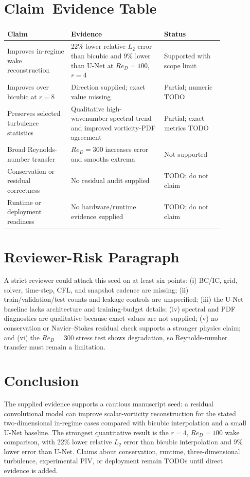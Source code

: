 \documentclass[11pt]{article}
\begin{document}
\section{Claim--Evidence Table}
\begin{center}
\begin{tabular}{p{0.26\linewidth}p{0.38\linewidth}p{0.24\linewidth}}
\toprule
Claim & Evidence & Status \\
\midrule
Improves in-regime wake reconstruction & 22\% lower relative $L_2$ error than bicubic and 9\% lower than U-Net at $Re_D=100$, $r=4$ & Supported with scope limit \\
Improves over bicubic at $r=8$ & Direction supplied; exact value missing & Partial; numeric TODO \\
Preserves selected turbulence statistics & Qualitative high-wavenumber spectral trend and improved vorticity-PDF agreement & Partial; exact metrics TODO \\
Broad Reynolds-number transfer & $Re_D=300$ increases error and smooths extrema & Not supported \\
Conservation or residual correctness & No residual audit supplied & TODO; do not claim \\
Runtime or deployment readiness & No hardware/runtime evidence supplied & TODO; do not claim \\
\bottomrule
\end{tabular}
\end{center}

\section{Reviewer-Risk Paragraph}
A strict reviewer could attack this seed on at least six points: (i) BC/IC, grid, solver, time-step, CFL, and snapshot cadence are missing; (ii) train/validation/test counts and leakage controls are unspecified; (iii) the U-Net baseline lacks architecture and training-budget details; (iv) spectral and PDF diagnostics are qualitative because exact values are not supplied; (v) no conservation or Navier--Stokes residual check supports a stronger physics claim; and (vi) the $Re_D=300$ stress test shows degradation, so Reynolds-number transfer must remain a limitation.

\section{Conclusion}
The supplied evidence supports a cautious manuscript seed: a residual convolutional model can improve scalar-vorticity reconstruction for the stated two-dimensional in-regime cases compared with bicubic interpolation and a small U-Net baseline. The strongest quantitative result is the $r=4$, $Re_D=100$ wake comparison, with 22\% lower relative $L_2$ error than bicubic interpolation and 9\% lower error than U-Net. Claims about conservation, runtime, three-dimensional turbulence, experimental PIV, or deployment remain TODOs until direct evidence is added.
\end{document}

